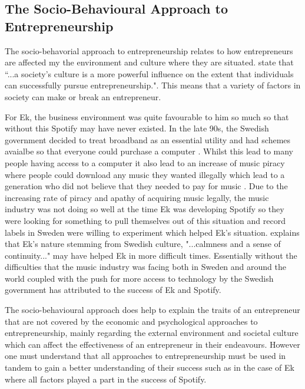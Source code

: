 \subsection{The Socio-Behavioural Approach to Entrepreneurship}
The socio-behavorial approach to entrepreneurship relates to how entrepreneurs are affected my the environment and culture where they are situated. \textcite[][17]{deakins2012} state that ``...a society's culture is a more powerful influence on the extent that individuals can successfully pursue entrepreneurship.". This means that a variety of factors in society can make or break an entrepreneur. 
\par
For Ek, the business environment was quite favourable to him so much so that without this Spotify may have never existed. In the late 90s, the Swedish government decided to treat broadband as an essential utility and had schemes avaialbe so that everyone could purchase a computer \parencite{lynskey2013}. Whilst this lead to many people having access to a computer it also lead to an increase of music piracy where people could download any music they wanted illegally which lead to a generation who did not believe that they needed to pay for music \parencite{bertoni2012}. Due to the increasing rate of piracy and apathy of acquiring music legally, the music industry was not doing so well at the time Ek was developing Spotify so they were looking for something to pull themselves out of this situation and record labels in Sweden were willing to experiment \parencite{ahmed2016} which helped Ek's situation. \textcite{ahmed2016} explains that Ek's nature stemming from Swedish culture, "...calmness and a sense of continuity..." may have helped Ek in more difficult times. Essentially without the difficulties that the music industry was facing both in Sweden and around the world coupled with the push for more access to technology by the Swedish government has attributed to the success of Ek and Spotify.
\par
The socio-behavioural approach does help to explain the traits of an entrepreneur that are not covered by the economic and psychological approaches to entrepreneurship, mainly regarding the external environment and societal culture which can affect the effectiveness of an entrepreneur in their endeavours. However one must understand that all approaches to entrepreneurship must be used in tandem to gain a better understanding of their success such as in the case of Ek where all factors played a part in the success of Spotify.